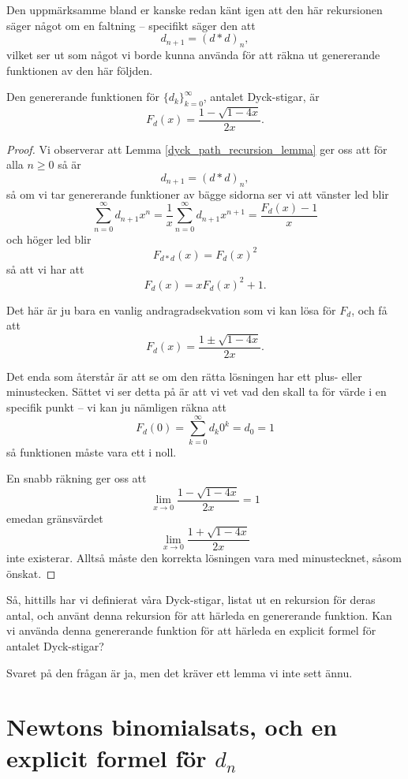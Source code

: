 \documentclass[nobib]{tufte-handout}
\begin{document}
Den uppmärksamme bland er kanske redan känt igen att den här rekursionen säger något om en faltning -- specifikt säger den att
$$d_{n+1} = (d * d)_n,$$
vilket ser ut som något vi borde kunna använda för att räkna ut genererande funktionen av den här följden.

\begin{proposition}
    Den genererande funktionen för $\{d_k\}_{k=0}^\infty$, antalet Dyck-stigar, är
    $$F_d(x) = \frac{1 - \sqrt{1 - 4x}}{2x}.$$

    \begin{proof}
        Vi observerar att Lemma \ref{dyck_path_recursion_lemma} ger oss att för alla $n \geq 0$ så är
        $$d_{n+1} = (d*d)_n,$$
        så om vi tar genererande funktioner av bägge sidorna ser vi att vänster led blir
        $$\sum_{n=0}^{\infty}d_{n+1}x^n = \frac{1}{x}\sum_{n=0}^{\infty} d_{n+1} x^{n+1} = \frac{F_d(x) - 1}{x}$$
        och höger led blir
        $$F_{d * d}(x) = F_d(x)^2$$
        så att vi har att
        $$F_d(x) = x F_d(x)^2 + 1.$$

        Det här är ju bara en vanlig andragradsekvation som vi kan lösa för $F_d$, och få att
        $$F_d(x) = \frac{1 \pm \sqrt{1 - 4x}}{2x}.$$

        Det enda som återstår är att se om den rätta lösningen har ett plus- eller minustecken. Sättet vi ser detta på är att vi vet vad den skall ta för värde i en specifik punkt -- vi kan ju nämligen räkna att
        $$F_d(0) = \sum_{k=0}^{\infty} d_k 0^k = d_0 = 1$$
        så funktionen måste vara ett i noll.

        En snabb räkning ger oss att
        $$\lim_{x \to 0} \frac{1 - \sqrt{1 - 4x}}{2x} = 1$$
        emedan gränsvärdet
        $$\lim_{x \to 0} \frac{1 + \sqrt{1 - 4x}}{2x}$$
        inte existerar. Alltså måste den korrekta lösningen vara med minustecknet, såsom önskat.
    \end{proof}
\end{proposition}

Så, hittills har vi definierat våra Dyck-stigar, listat ut en rekursion för deras antal, och använt denna rekursion för att härleda en genererande funktion. Kan vi använda denna genererande funktion för att härleda en explicit formel för antalet Dyck-stigar?

Svaret på den frågan är ja, men det kräver ett lemma vi inte sett ännu.

\section{Newtons binomialsats, och en explicit formel för $d_n$}
\end{document}
